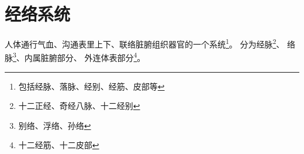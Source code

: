 \section{经络系统}
人体通行气血、沟通表里上下、联络脏腑组织器官的一个系统\footnote{包括经脉、落脉、经别、经筋、皮部等}。
分为经脉\footnote{十二正经、奇经八脉、十二经别}、
络脉\footnote{别络、浮络、孙络}、内属脏腑部分、
外连体表部分\footnote{十二经筋、十二皮部}。
